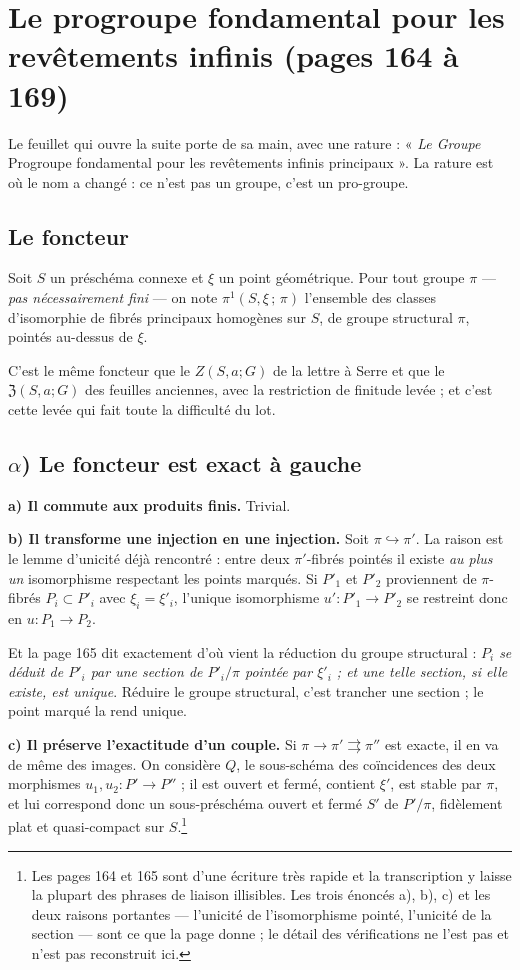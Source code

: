 \documentclass[11pt,a4paper]{article}
\begin{document}
\section*{Le progroupe fondamental pour les revêtements infinis (pages 164 à 169)}

Le feuillet qui ouvre la suite porte de sa main, avec une rature :
« \emph{Le Groupe} \; Progroupe fondamental pour les revêtements infinis
principaux ». La rature est où le nom a changé : ce n'est pas un groupe, c'est
un pro-groupe.

\subsection*{Le foncteur}

Soit $S$ un préschéma connexe et $\xi$ un point géométrique. Pour tout groupe
$\pi$ --- \emph{pas nécessairement fini} --- on note $\pi^{1}(S, \xi\,;\, \pi)$ l'ensemble des classes d'isomorphie de
fibrés principaux homogènes sur $S$, de groupe structural $\pi$, pointés
au-dessus de $\xi$.

C'est le même foncteur que le $Z(S,a;G)$ de la lettre à Serre et que le
$\mathfrak{Z}(S,a;G)$ des feuilles anciennes, avec la restriction de finitude
levée ; et c'est cette levée qui fait toute la difficulté du lot.

\subsection*{$\alpha$) Le foncteur est exact à gauche}

\textbf{a) Il commute aux produits finis.} Trivial.

\textbf{b) Il transforme une injection en une injection.} Soit
$\pi \hookrightarrow \pi'$. La raison est le lemme d'unicité déjà rencontré :
entre deux $\pi'$-fibrés pointés il existe \emph{au plus un} isomorphisme
respectant les points marqués. Si $P'_{1}$ et $P'_{2}$ proviennent de
$\pi$-fibrés $P_{i} \subset P'_{i}$ avec $\xi_{i} = \xi'_{i}$, l'unique
isomorphisme $u' : P'_{1} \to P'_{2}$ se restreint donc en
$u : P_{1} \to P_{2}$.

Et la page 165 dit exactement d'où vient la réduction du groupe structural :
\emph{$P_{i}$ se déduit de $P'_{i}$ par une section de $P'_{i}/\pi$ pointée par
$\xi'_{i}$ ; et une telle section, si elle existe, est unique}. Réduire le
groupe structural, c'est trancher une section ; le point marqué la rend unique.

\textbf{c) Il préserve l'exactitude d'un couple.} Si
$\pi \to \pi' \rightrightarrows \pi''$ est exacte, il en va de même des images.
On considère $Q$, le sous-schéma des coïncidences des deux morphismes
$u_{1}, u_{2} : P' \to P''$ ; il est ouvert et fermé, contient $\xi'$, est
stable par $\pi$, et lui correspond donc un sous-préschéma ouvert et fermé
$S'$ de $P'/\pi$, fidèlement plat et quasi-compact sur
$S$.\footnote{Les pages 164 et 165 sont d'une écriture très rapide et la
transcription y laisse la plupart des phrases de liaison illisibles. Les trois
énoncés a), b), c) et les deux raisons portantes --- l'unicité de l'isomorphisme
pointé, l'unicité de la section --- sont ce que la page donne ; le détail des
vérifications ne l'est pas et n'est pas reconstruit ici.}
\end{document}
